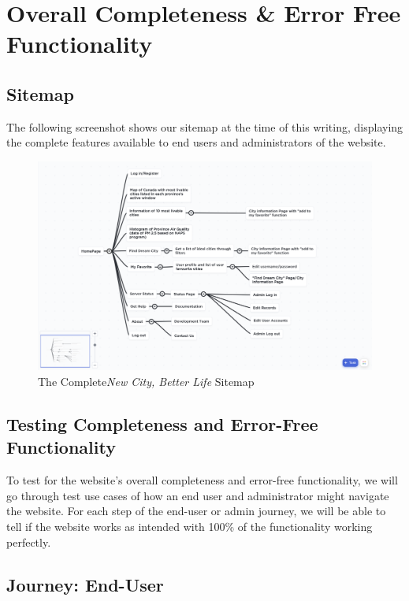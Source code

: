 \documentclass[12pt, letterpaper]{article}
\begin{document}
\newpage

\section{Overall Completeness \& Error Free Functionality}

\subsection*{Sitemap}
The following screenshot shows our sitemap at the time of this writing, displaying the complete features available to end users and administrators of the website.

\begin{figure}[htbp]
	\centering
	\includegraphics[width=\textwidth]{images/30-sitemap.png}
	\caption{The Complete\textit{New City, Better Life} Sitemap}
 \end{figure}

\subsection*{Testing Completeness and Error-Free Functionality}
To test for the website's overall completeness and error-free functionality, we will go through test use cases of how an end user and administrator might navigate the website. 
For each step of the end-user or admin journey, we will be able to tell if the website works as intended with 100\% of the functionality working perfectly.

\newpage
\subsection*{Journey: End-User}
\end{document}
